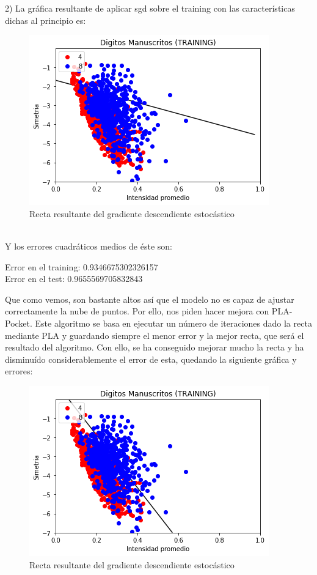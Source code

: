 \documentclass[12pt]{article}
\begin{document}
2) La gráfica resultante de aplicar sgd sobre el training con las características dichas al principio es:\\
\begin{figure}[h]
\centering
\includegraphics[scale=0.75]{Images/EjB3.png} 
\caption{Recta resultante del gradiente descendiente estocástico}
\label{etiqueta}
\end{figure}
\\
Y los errores cuadráticos medios de éste son:
\begin{center}
Error en el training:  0.9346675302326157\\
Error en el test:  0.9655569705832843
\end{center}
Que como vemos, son bastante altos así que el modelo no es capaz de ajustar correctamente la nube de puntos. Por ello, nos piden hacer mejora con PLA-Pocket. Este algoritmo se basa en ejecutar un número de iteraciones dado la recta mediante PLA y guardando siempre el menor error y la mejor recta, que será el resultado del algoritmo. Con ello, se ha conseguido mejorar mucho la recta y ha disminuído considerablemente el error de esta, quedando la siguiente gráfica y errores:\\
\begin{figure}[h]
\centering
\includegraphics[scale=0.75]{Images/EjB4.png} 
\caption{Recta resultante del gradiente descendiente estocástico}
\label{etiqueta}
\end{figure}
\end{document}
